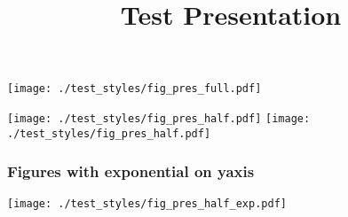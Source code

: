 \documentclass[xcolor=dvipsnames]{beamer}
\title{Test Presentation}
\begin{document}
\frame[plain]{\titlepage}

\begin{frame}[plain]
  \texttt{[image: ./test\_styles/fig\_pres\_full.pdf]}
\end{frame}
%   

\begin{frame}
  \texttt{[image: ./test\_styles/fig\_pres\_half.pdf]}
  \texttt{[image: ./test\_styles/fig\_pres\_half.pdf]}
\end{frame}

\begin{frame}
  \frametitle{Figures with exponential on yaxis}
  \texttt{[image: ./test\_styles/fig\_pres\_half\_exp.pdf]}
\end{frame}
\end{document}
